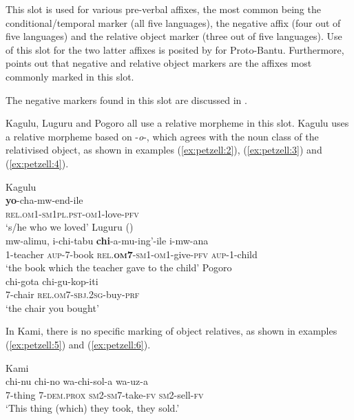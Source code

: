 \documentclass[output=paper,
            colorlinks, citecolor=brown
            ,draftmode
		  ]{langscibook}
\begin{document}
This slot is used for various pre-verbal affixes, the most common being the conditional/temporal marker (all five languages), the negative affix (four out of five languages) and the relative object marker (three out of five languages). Use of this slot for the two latter affixes is posited by \citet[108]{Meeussen1967} for Proto-Bantu. Furthermore, \citet[32]{Nurse2008} points out that negative and relative object markers are the affixes most commonly marked in this slot.



The negative markers found in this slot are discussed in  .



Kagulu, Luguru and Pogoro all use a relative morpheme in this slot. Kagulu uses a relative morpheme based on -\textit{o}{}-, which agrees with the noun class of the relativised object, as shown in examples (\ref{ex:petzell:2}), (\ref{ex:petzell:3}) and (\ref{ex:petzell:4}).


\ea\label{ex:petzell:2} Kagulu\\
\gll \textbf{yo}{}-cha-mw-end-ile \\                            
\textsc{{rel}}.\textsc{{om}}{1}{}-\textsc{sm}1\textsc{pl}.\textsc{pst}{}-\textsc{om}1-love-\textsc{pfv}\footnotemark{} \\
\glt `s/he who we loved'
\ex\label{ex:petzell:3} Luguru (\citealt[179]{Mkude1974})\\
\gll mw-alimu,  i-chi-tabu    \textbf{chi}{}-a-mu-ing'-ile          i-mw-ana \\
1-teacher  \textsc{aup}{}-7-book  \textsc{{rel}}.\textsc{\textbf{om7}}{}-\textsc{sm1}{}-\textsc{om1}{}-give-\textsc{pfv}   \textsc{aup}{}-1-child\\
\glt `the book which the teacher gave to the child'
\ex\label{ex:petzell:4}Pogoro\\
\gll chi-gota    chi-gu-kop-iti \\
7-chair    \textsc{rel.om}7-\textsc{sbj}.2\textsc{sg}{}-buy-\textsc{prf}\\
\glt `the chair you bought'
\z
{}


In Kami, there is no specific marking of object relatives, as shown in examples (\ref{ex:petzell:5}) and (\ref{ex:petzell:6}).


\ea\label{ex:petzell:5}Kami\\
\gll chi-nu  chi-no        wa-chi-sol-a      wa-uz-a\\
7-thing  7-\textsc{dem}.\textsc{prox}    \textsc{sm2}{}-\textsc{sm7}{}-take-\textsc{fv}   \textsc{sm2}{}-sell-\textsc{fv}\\
\glt `This thing (which) they took, they sold.'
\end{document}
